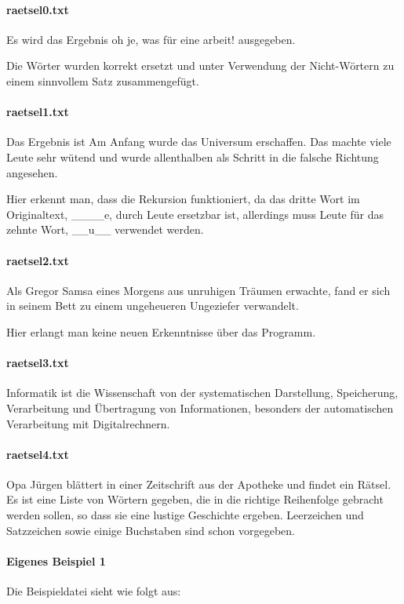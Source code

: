 \documentclass[a4paper,10pt,ngerman]{scrartcl}
\begin{document}
\paragraph{raetsel0.txt}
Es wird das Ergebnis \glqq oh je, was für eine arbeit!\grqq{} ausgegeben.

Die Wörter wurden korrekt ersetzt und unter Verwendung der Nicht-Wörtern zu einem sinnvollem Satz zusammengefügt.

\paragraph{raetsel1.txt}
Das Ergebnis ist \glqq Am Anfang wurde das Universum erschaffen.
Das machte viele Leute sehr wütend und wurde allenthalben als Schritt in die falsche Richtung angesehen.\grqq{}

Hier erkennt man, dass die Rekursion funktioniert, da das dritte Wort im Originaltext, \glqq \_\_\_\_e\grqq{}, durch \glqq Leute\grqq{} ersetzbar ist, allerdings muss \glqq Leute\grqq{} für das zehnte Wort, \glqq \_\_u\_\_\grqq{} verwendet werden.

\paragraph{raetsel2.txt}
\glqq Als Gregor Samsa eines Morgens aus unruhigen Träumen erwachte, fand er sich in seinem Bett zu einem ungeheueren Ungeziefer verwandelt.\grqq{}

Hier erlangt man keine neuen Erkenntnisse über das Programm.

\paragraph{raetsel3.txt}
\glqq Informatik ist die Wissenschaft von der systematischen Darstellung, Speicherung, Verarbeitung und Übertragung von Informationen, besonders der automatischen Verarbeitung mit Digitalrechnern.\grqq{}

\paragraph{raetsel4.txt}
\glqq Opa Jürgen blättert in einer Zeitschrift aus der Apotheke und findet ein Rätsel. Es ist eine Liste von Wörtern gegeben, die in die richtige Reihenfolge gebracht werden sollen, so dass sie eine lustige Geschichte ergeben. Leerzeichen und Satzzeichen sowie einige Buchstaben sind schon vorgegeben.\grqq{}

\paragraph{Eigenes Beispiel 1}
Die Beispieldatei sieht wie folgt aus:
\end{document}
